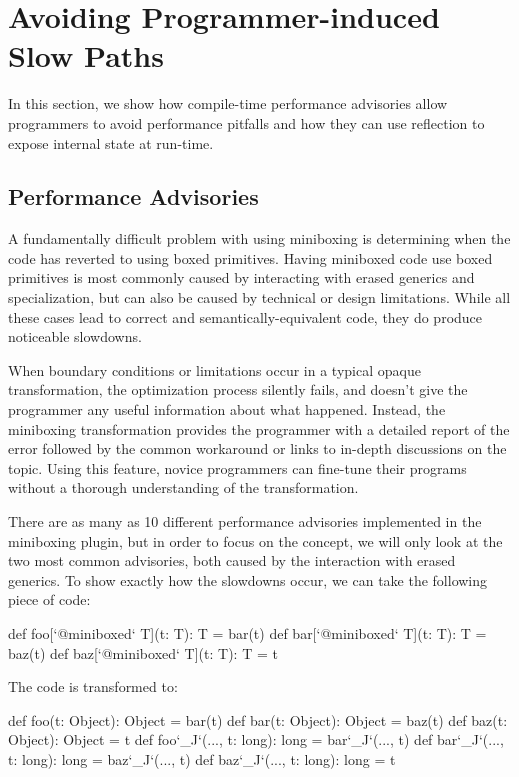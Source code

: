 \section{Avoiding Programmer-induced Slow Paths}
\label{sec:advisories}

In this section, we show how compile-time performance advisories allow programmers to avoid performance pitfalls and how they can use reflection to expose internal state at run-time.

\subsection{Performance Advisories}

A fundamentally difficult problem with using miniboxing is determining when the code has reverted to using boxed primitives. Having miniboxed code use boxed primitives is most commonly caused by interacting with erased generics and specialization, but can also be caused by technical or design limitations. While all these cases lead to correct and semantically-equivalent code, they do produce noticeable slowdowns.

When boundary conditions or limitations occur in a typical opaque transformation, the optimization process silently fails, and doesn't give the programmer any useful information about what happened. Instead, the miniboxing transformation provides the programmer with a detailed report of the error followed by the common workaround or links to in-depth discussions on the topic. Using this feature, novice programmers can fine-tune their programs without a thorough understanding of the transformation.

There are as many as 10 different performance advisories implemented in the miniboxing plugin, but in order to focus on the concept, we will only look at the two most common advisories, both caused by the interaction with erased generics. To show exactly how the slowdowns occur, we can take the following piece of code:

\begin{lstlisting-nobreak}
 def foo[`@miniboxed` T](t: T): T = bar(t)
 def bar[`@miniboxed` T](t: T): T = baz(t)
 def baz[`@miniboxed` T](t: T): T = t
\end{lstlisting-nobreak}

The code is transformed to:

\begin{lstlisting-nobreak}
 def foo(t: Object): Object = bar(t)
 def bar(t: Object): Object = baz(t)
 def baz(t: Object): Object = t
 def foo`_J`(..., t: long): long = bar`_J`(..., t)
 def bar`_J`(..., t: long): long = baz`_J`(..., t)
 def baz`_J`(..., t: long): long = t
\end{lstlisting-nobreak}

